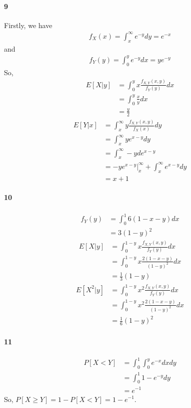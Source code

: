 \documentclass[22pt]{article}
\begin{document}
	 \paragraph{9}
	 Firstly, we have
	 \begin{align}
	 f_X(x) =  \int_{x}^{\infty}e^{-y}dy = e^{-x}
	 \end{align}
	 and
	 \begin{align}
	 f_Y(y) = \int_{0}^{y}e^{-y}dx = ye^{-y}
	 \end{align}
	 So,
	 \begin{align}
	 E[X|y] & =  \int_{0}^{y} x \frac{f_{X,Y}(x,y)}{f_Y(y)} dx\\
	 & = \int_{0		}^{y} \frac{x}{y} dx\\
	 & = \frac{y}{2}
	 \end{align}
	 \begin{align}
	 E[Y|x] & = \int_{x}^{\infty} y\frac{f_{X,Y}(x,y)}{f_X(x)} dy\\
	 & = \int_{x}^{\infty} y e^{x-y} dy\\
	 & = \int_{x}^{\infty} -y de^{x-y}\\
	 & = -ye^{x-y}|_{x}^{\infty} +  \int_{x}^{\infty} e^{x-y}dy\\
	 & = x+1
	 \end{align}

	 \paragraph{10}
	 \begin{align}
	 f_Y(y) & =  \int_{0}^{1} 6(1-x-y)dx\\
	 & = 3(1-y)^2 
	 \end{align}
	 \begin{align}
	 E[X|y] & = \int_{0}^{1-y} x\frac{f_{X,Y}(x,y)}{f_Y(y)} dx\\
	 & = \int_{0}^{1-y} x\frac{2(1-x-y)}{(1-y)^2} dx\\
 	 & = \frac{1}{3}(1-y)
	 \end{align}
	 \begin{align}
	 E[X^2|y] & = \int_{0}^{1-y} x^2\frac{f_{X,Y}(x,y)}{f_Y(y)} dx\\
	 & = \int_{0}^{1-y} x^2\frac{2(1-x-y)}{(1-y)^2} dx\\
 	 & = \frac{1}{6}(1-y)^2
	 \end{align}

	 \paragraph{11}
	 \begin{align}
	 P[X<Y] & = \int_{0}^{1}\int_{0}^{y}e^{-x}dxdy\\
	 & = \int_{0}^{1}1-e^{-y}dy\\
	 & = e^{-1}	
	 \end{align}
	 So, $P[X\geq Y] = 1- P[X<Y] = 1 - e^{-1}$.
\end{document}

